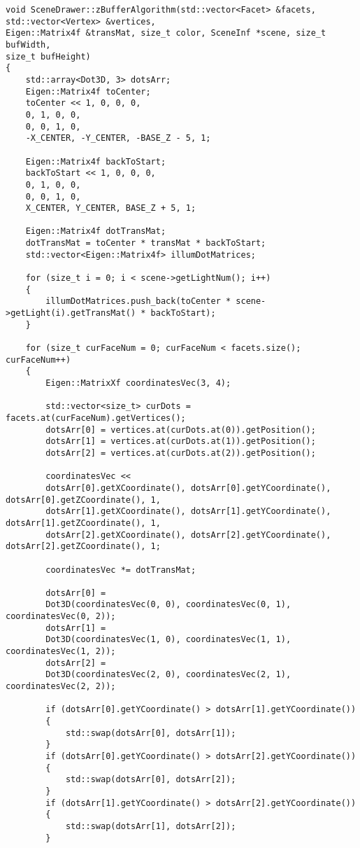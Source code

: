 \begin{center}
	\captionsetup{justification=raggedright,singlelinecheck=off}
	\begin{lstlisting}[caption=Реализация алгоритма Z-буфера]
void SceneDrawer::zBufferAlgorithm(std::vector<Facet> &facets, std::vector<Vertex> &vertices,
Eigen::Matrix4f &transMat, size_t color, SceneInf *scene, size_t bufWidth,
size_t bufHeight)
{
	std::array<Dot3D, 3> dotsArr;
	Eigen::Matrix4f toCenter;
	toCenter << 1, 0, 0, 0,
	0, 1, 0, 0,
	0, 0, 1, 0,
	-X_CENTER, -Y_CENTER, -BASE_Z - 5, 1;
	
	Eigen::Matrix4f backToStart;
	backToStart << 1, 0, 0, 0,
	0, 1, 0, 0,
	0, 0, 1, 0,
	X_CENTER, Y_CENTER, BASE_Z + 5, 1;
	
	Eigen::Matrix4f dotTransMat;
	dotTransMat = toCenter * transMat * backToStart;
	std::vector<Eigen::Matrix4f> illumDotMatrices;
	
	for (size_t i = 0; i < scene->getLightNum(); i++)
	{
		illumDotMatrices.push_back(toCenter * scene->getLight(i).getTransMat() * backToStart);
	}
	
	for (size_t curFaceNum = 0; curFaceNum < facets.size(); curFaceNum++)
	{
		Eigen::MatrixXf coordinatesVec(3, 4);
		
		std::vector<size_t> curDots = facets.at(curFaceNum).getVertices();
		dotsArr[0] = vertices.at(curDots.at(0)).getPosition();
		dotsArr[1] = vertices.at(curDots.at(1)).getPosition();
		dotsArr[2] = vertices.at(curDots.at(2)).getPosition();
		
		coordinatesVec <<
		dotsArr[0].getXCoordinate(), dotsArr[0].getYCoordinate(), dotsArr[0].getZCoordinate(), 1,
		dotsArr[1].getXCoordinate(), dotsArr[1].getYCoordinate(), dotsArr[1].getZCoordinate(), 1,
		dotsArr[2].getXCoordinate(), dotsArr[2].getYCoordinate(), dotsArr[2].getZCoordinate(), 1;
		
		coordinatesVec *= dotTransMat;
		
		dotsArr[0] =
		Dot3D(coordinatesVec(0, 0), coordinatesVec(0, 1), coordinatesVec(0, 2));
		dotsArr[1] =
		Dot3D(coordinatesVec(1, 0), coordinatesVec(1, 1), coordinatesVec(1, 2));
		dotsArr[2] =
		Dot3D(coordinatesVec(2, 0), coordinatesVec(2, 1), coordinatesVec(2, 2));
		
		if (dotsArr[0].getYCoordinate() > dotsArr[1].getYCoordinate())
		{
			std::swap(dotsArr[0], dotsArr[1]);
		}
		if (dotsArr[0].getYCoordinate() > dotsArr[2].getYCoordinate())
		{
			std::swap(dotsArr[0], dotsArr[2]);
		}
		if (dotsArr[1].getYCoordinate() > dotsArr[2].getYCoordinate())
		{
			std::swap(dotsArr[1], dotsArr[2]);
		}
		

\end{lstlisting}
\end{center}
